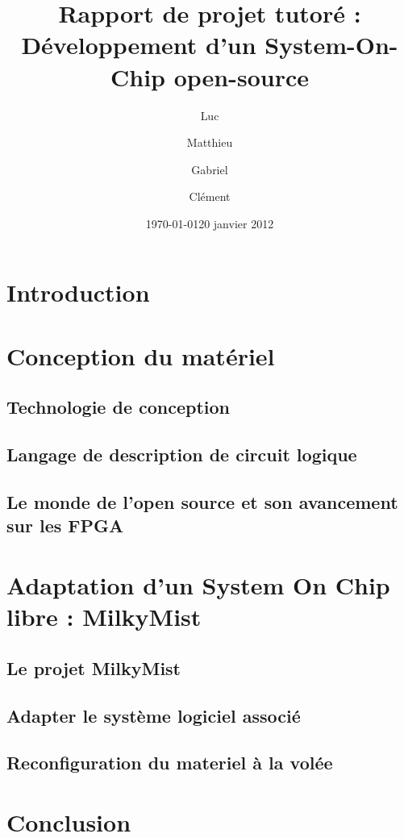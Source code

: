 \documentclass{report}
\date{\today}
\author{}
\title{}
\title{Rapport de projet tutoré : Développement d'un System-On-Chip open-source}
\author{\bsc{DUZAN} Luc \and \bsc{LONGO} Matthieu \and \bsc{FARACHE} Gabriel \and \bsc{MICHAUD} Clément }
\date{20 janvier 2012}
\begin{document}
\maketitle

\tableofcontents

\chapter*{Introduction}
    

\chapter{Conception du matériel}

\section{Technologie de conception}
    
    \newpage

\section{Langage de description de circuit logique}
    
    \newpage

\section{Le monde de l'open source et son avancement sur les FPGA}
    
    \newpage

\chapter{Adaptation d'un System On Chip libre : MilkyMist}

\section{Le projet MilkyMist}
    
    \newpage
\section{Adapter le système logiciel associé}
    
    \newpage

\section{Reconfiguration du materiel à la volée}
    
    \newpage

\chapter*{Conclusion}


\end{document}
